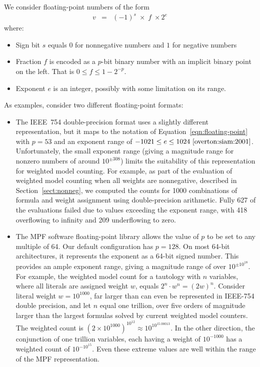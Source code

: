 \documentclass[letterpaper,USenglish,cleveref, autoref, thm-restate]{lipics-v2021}
\begin{document}
We consider floating-point numbers of the form
\begin{eqnarray}
v & = & (-1)^s \; \times \; f \; \times 2^{e} \label{eqn:floating-point}
\end{eqnarray}
where:
\begin{itemize}
\item Sign bit $s$ equals $0$ for nonnegative numbers and $1$ for negative numbers
\item Fraction $f$ is encoded as a $p$-bit binary number with an implicit binary point on the left.  That is $0 \leq f \leq 1-2^{-p}$.
\item Exponent $e$ is an integer, possibly with some limitation on its range.
\end{itemize}
As examples, consider two different floating-point formats:
\begin{itemize}
\item The IEEE~754 double-precision format uses a slightly different
  representation, but it maps to the notation of
  Equation~\ref{eqn:floating-point} with $p=53$ and an exponent range
  of $-1021 \leq e \leq 1024~\cite{overton:siam:2001}$.
  Unfortunately, the small exponent range (giving a magnitude range
  for nonzero numbers of around $10^{\pm 308}$) limits the suitability of
  this representation for weighted model counting.  For example, as
  part of the evaluation of weighted model counting when all weights
  are nonnegative, described in Section~\ref{sect:nonneg}, we computed
  the counts for 1000 combinations of formula and weight assignment
  using double-precision arithmetic.
  Fully 627 of the evaluations failed due to values exceeding the exponent range,
  with 418 overflowing to infinity and 209 underflowing to zero.
\item The MPF software floating-point library allows the value of $p$
  to be set to any multiple of 64.  Our default configuration has $p=128$. On
  most 64-bit architectures, it represents the exponent as a 64-bit
  signed number.  This provides an ample exponent range, giving a
  magnitude range of over $10^{\pm 10^{18}}$.
  For example, the weighted model count for a tautology with $n$ variables,
  where all literals are assigned weight $w$, equals
  $2^n\cdot w^n = (2w)^n$.  Consider literal weight $w=10^{1000}$,
 far larger than can even be represented in IEEE-754 double precision, and let $n$ equal one trillion, over five orders of magnitude
 larger than the largest formulas solved by current weighted model counters.  The weighted count is
 $(2 \times 10^{1000})^{10^{12}} \approx 10^{10^{15.00013}}$.  In the other direction, the conjunction of one trillion variables, each having a weight
 of $10^{-1000}$ has a weighted count of $10^{-10^{15}}$.  Even these extreme values are
 well within the range of the MPF representation.
\end{itemize}
\end{document}
